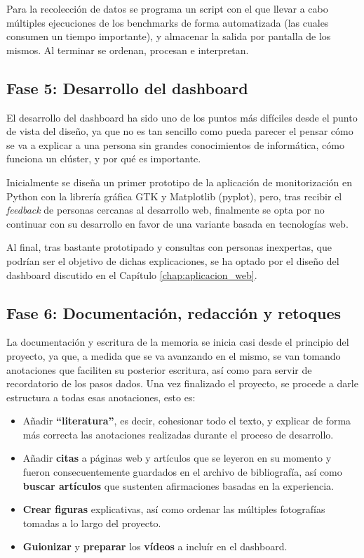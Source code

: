 Para la recolección de datos se programa un script con el que llevar a cabo múltiples ejecuciones de los benchmarks de forma automatizada (las cuales consumen un tiempo importante), y almacenar la salida por pantalla de los mismos. Al terminar se ordenan, procesan e interpretan.

\subsection{Fase 5: Desarrollo del dashboard}
El desarrollo del dashboard ha sido uno de los puntos más difíciles desde el punto de vista del diseño, ya que no es tan sencillo como pueda parecer el pensar cómo se va a explicar a una persona sin grandes conocimientos de informática, cómo funciona un clúster, y por qué es importante.

Inicialmente se diseña un primer prototipo de la aplicación de monitorización en Python con la librería gráfica GTK y Matplotlib (pyplot), pero, tras recibir el \textit{feedback} de personas cercanas al desarrollo web, finalmente se opta por no continuar con su desarrollo en favor de una variante basada en tecnologías web.

Al final, tras bastante prototipado y consultas con personas inexpertas, que podrían ser el objetivo de dichas explicaciones, se ha optado por el diseño del dashboard discutido en el Capítulo \ref{chap:aplicacion_web}.

\subsection{Fase 6: Documentación, redacción y retoques}
La documentación y escritura de la memoria se inicia casi desde el principio del proyecto, ya que, a medida que se va avanzando en el mismo, se van tomando anotaciones que faciliten su posterior escritura, así como para servir de recordatorio de los pasos dados. Una vez finalizado el proyecto, se procede a darle estructura a todas esas anotaciones, esto es:
\begin{itemize}
    \item Añadir \textbf{``literatura''}, es decir, cohesionar todo el texto, y explicar de forma más correcta las anotaciones realizadas durante el proceso de desarrollo.
    \item Añadir \textbf{citas} a páginas web y artículos que se leyeron en su momento y fueron consecuentemente guardados en el archivo de bibliografía, así como \textbf{buscar artículos} que sustenten afirmaciones basadas en la experiencia.
    \item \textbf{Crear figuras} explicativas, así como ordenar las múltiples fotografías tomadas a lo largo del proyecto.
    \item \textbf{Guionizar} y \textbf{preparar} los \textbf{vídeos} a incluír en el dashboard.
\end{itemize}

